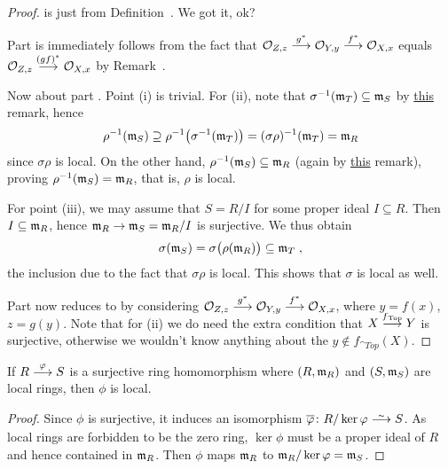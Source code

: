 \documentclass[a4paper,parskip=half,numbers=enddot, DIV=12]{scrreprt}
\begin{document}
\begin{proof}
	 is just \itememph{\alpha} from Definition~. We got it, ok?
	
	Part  is immediately follows from the fact that $\Oo_{Z,z}\morphism[g^*]\Oo_{Y,y}\morphism[f^*]\Oo_{X,x}$ equals $\Oo_{Z,z}\morphism[(gf)^*]\Oo_{X,x}$ by Remark~.
	
	Now about part . Point (i) is trivial. For (ii), note that $\sigma^{-1}(\mathfrak{m}_T)\subseteq\mathfrak{m}_S$ by \hyperref[rem:localMorphismStuff]{this} remark, hence
	\begin{align*}
		\rho^{-1}(\mathfrak{m}_S) \supseteq \rho^{-1}\big(\sigma^{-1}(\mathfrak{m}_T)\big) = (\sigma\rho)^{-1} (\mathfrak{m}_T) = \mathfrak{m}_R
	\end{align*}
	since $\sigma\rho$ is local. On the other hand, $\rho^{-1}(\mathfrak{m}_S)\subseteq \mathfrak{m}_R$ (again by \hyperref[rem:localMorphismStuff]{this} remark), proving $\rho^{-1}(\mathfrak{m}_S)=\mathfrak{m}_R$, that is, $\rho$ is local.
	
	For point (iii), we may assume that $S=R/I$ for some proper ideal $I\subseteq R$. Then $I\subseteq\mathfrak{m}_R$, hence $\mm_R\morphism \mm_S=\mm_R/I$ is surjective. We thus obtain
	\begin{align*}
		\sigma(\mathfrak{m}_S)=\sigma\big(\rho(\mathfrak{m}_R)\big)\subseteq\mathfrak{m}_T\;,
	\end{align*}
	the inclusion due to the fact that $\sigma\rho$ is local. This shows that $\sigma$ is local as well.
	
	Part  now reduces to  by considering $\Oo_{Z,z}\morphism[g^*]\Oo_{Y,y}\morphism[f^*]\Oo_{X,x}$, where $y=f(x)$, $z=g(y)$. Note that for (ii) we do need the extra condition that $X\morphism[\smash{f}_{\cat{Top}}]Y$ is surjective, otherwise we wouldn't know anything about the $y\not\in f_{\cat{Top}}(X)$.
\end{proof}
\begin{fact}
    If $R\morphism[\phi]S$ is a surjective ring homomorphism where $(R,\mathfrak{m}_R)$ and $(S,\mathfrak{m}_S)$ are local rings, then $\phi$ is local.
\end{fact}
\begin{proof}
	Since $\phi$ is surjective, it induces an isomorphism $\ov{\phi}\colon R/\ker\phi\isomorphism S$. As local rings are forbidden to be the zero ring, $\ker\phi$ must be a proper ideal of $R$ and hence contained in $\mathfrak{m}_R$. Then $\phi$ maps $\mathfrak{m}_R$ to $\mathfrak{m}_R/\ker\varphi=\mathfrak{m}_S$.
\end{proof}
\end{document}
